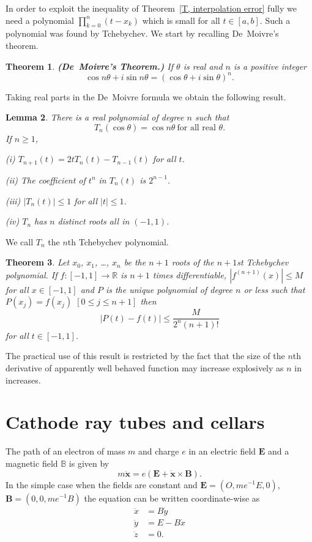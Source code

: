 \documentclass[12pt]{article}
\newtheorem{theorem}{Theorem}[section]
\newtheorem{lemma}[theorem]{Lemma}
\theoremstyle{definition}
\begin{document}
In order to exploit the inequality of 
Theorem~\ref{T, interpolation error} fully we need a polynomial
$\prod_{k=0}^{n}(t-x_{k})$ which is small for all $t\in[a,b]$.
Such a polynomial was found by Tchebychev.
We start by recalling De~Moivre's theorem.
\begin{theorem}{\bf (De~Moivre's Theorem.)}
If $\theta$ is real and $n$ is a positive integer
\[\cos n\theta+i\sin n\theta=(\cos\theta+i\sin\theta)^{n}.\]
\end{theorem}
Taking real parts in the De~Moivre formula we obtain the following result.
\begin{lemma}\label{L, Tchebychev} There is
a real polynomial of degree $n$ such that
\[T_{n}(\cos\theta)=\cos n\theta
\ \text{for all real $\theta$.}\]
If $n\geq 1$,

(i) $T_{n+1}(t)=2tT_{n}(t)-T_{n-1}(t)$ for all $t$.

(ii) The coefficient of $t^{n}$ in $T_{n}(t)$ is $2^{n-1}$.

(iii) $|T_{n}(t)|\leq 1$ for all $|t|\leq 1$.

(iv) $T_{n}$ has $n$ distinct roots all in $(-1,1)$.
\end{lemma}

We call $T_{n}$ the $n$th Tchebychev polynomial.
\begin{theorem}
Let $x_{0}$, $x_{1}$, \dots, $x_{n}$ be the $n+1$ roots
of the $n+1$st Tchebychev polynomial. 
If $f:[-1,1]\rightarrow{\mathbb R}$
is $n+1$ times differentiable, $|f^{(n+1)}(x)|\leq M$
for all $x\in[-1,1]$ and $P$ is the unique polynomial
of degree $n$ or less such that $P(x_{j})=f(x_{j})$
$[0\leq j\leq n+1]$ then
\[|P(t)-f(t)|\leq \frac{M}{2^{n}(n+1)!}\]
for all $t\in[-1,1]$.
\end{theorem}
The practical use of this result is restricted
by the fact that the size of the $n$th derivative
of apparently well behaved function may increase explosively
as $n$ in increases. 

\section{Cathode ray tubes and cellars}\label{S, Electron}
The path of an electron of mass $m$ and charge $e$
in an electric field ${\mathbf E}$
and a magnetic field ${\mathbb B}$ is given by
\[m\ddot{\mathbf x}=e({\mathbf E}+\dot{\mathbf x}\times {\mathbf B}).\]
In the simple case when the fields are constant
and ${\mathbf E}=(O,me^{-1}E,0)$, ${\mathbf B}=(0,0,me^{-1}B)$
the equation can be written coordinate-wise as
\begin{align*}
\ddot{x}&=B\dot{y}\\
\ddot{y}&=E-B\dot{x}\\
\ddot{z}&=0.
\end{align*}
\end{document}
